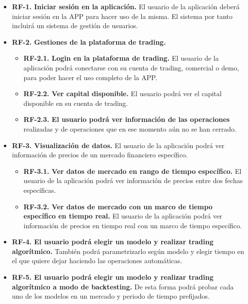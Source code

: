 \begin{itemize}
	
	\item \textbf{RF-1. Iniciar sesión en la aplicación.} El usuario de la aplicación deberá iniciar sesión en la APP para hacer uso de la misma. El sistema por tanto incluirá un sistema de gestión de usuarios.
	
	\item \textbf{RF-2. Gestiones de la plataforma de trading.} 
	\begin{itemize}
		\item \textbf{RF-2.1. Login en la plataforma de trading.} El usuario de la aplicación podrá conectarse con su cuenta de trading, comercial o demo, para poder hacer el uso completo de la APP.
		\item \textbf{RF-2.2. Ver capital disponible.} El usuario podrá ver el capital disponible en su cuenta de trading.
		\item \textbf{RF-2.3. El usuario podrá ver información de las operaciones} realizadas y de operaciones que en ese momento aún no se han cerrado.
	\end{itemize}

	\item \textbf{RF-3. Visualización de datos.} El usuario de la aplicación podrá ver información de precios de un mercado financiero específico.
	\begin{itemize}
		\item \textbf{RF-3.1. Ver datos de mercado en rango de tiempo específico.} El usuario de la aplicación podrá ver información de precios entre dos fechas específicas.
		\item \textbf{RF-3.2. Ver datos de mercado con un marco de tiempo específico en tiempo real.} El usuario de la aplicación podrá ver información de precios en tiempo real con un marco de tiempo específico.
	\end{itemize}

	\item \textbf{RF-4. El usuario podrá elegir un modelo y realizar trading algorítmico.} También podrá parametrizarlo según modelo y elegir tiempo en el que quiere dejar haciendo las operaciones automáticas. 

	\item \textbf{RF-5. El usuario podrá elegir un modelo y realizar trading algorítmico a modo de backtesting.} De esta forma podrá probar cada uno de los modelos en un mercado y periodo de tiempo prefijados.
	
\end{itemize}

